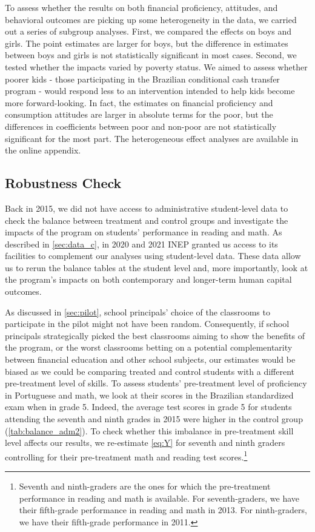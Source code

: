 To assess whether the results on both financial proficiency, attitudes, and behavioral outcomes are picking up some heterogeneity in the data, we carried out a series of subgroup analyses. First, we compared the effects on boys and girls. The point estimates are larger for boys, but the difference in estimates between boys and girls is not statistically significant in most cases. Second, we tested whether the impacts varied by poverty status. We aimed to assess whether poorer kids - those participating in the Brazilian conditional cash transfer program - would respond less to an intervention intended to help kids become more forward-looking. In fact, the estimates on financial proficiency and consumption attitudes are larger in absolute terms for the poor, but the differences in coefficients between poor and non-poor are not statistically significant for the most part. The heterogeneous effect analyses are available in the online appendix.   

\subsection{Robustness Check} 

Back in 2015, we did not have access to administrative student-level data to check the balance between treatment and control groups and investigate the impacts of the program on students' performance in reading and math. As described in \autoref{sec:data_c}, in 2020 and 2021 INEP granted us access to its facilities to complement our analyses using student-level data. These data allow us to rerun the balance tables at the student level and, more importantly, look at the program's impacts on both contemporary and longer-term human capital outcomes.

As discussed in \autoref{sec:pilot}, school principals' choice of the classrooms to participate in the pilot might not have been random. Consequently, if school principals strategically picked the best classrooms aiming to show the benefits of the program, or the worst classrooms betting on a potential complementarity between financial education and other school subjects, our estimates would be biased as we could be comparing treated and control students with a different pre-treatment level of skills. To assess students' pre-treatment level of proficiency in Portuguese and math, we look at their scores in the Brazilian standardized exam when in grade 5. Indeed, the average test scores in grade 5 for students attending the seventh and ninth grades in 2015 were higher in the control group (\autoref{tab:balance_adm2}). To check whether this imbalance in pre-treatment skill level affects our results, we re-estimate \autoref{eq:Y} for seventh and ninth graders controlling for their pre-treatment math and reading test scores.\footnote{Seventh and ninth-graders are the ones for which the pre-treatment performance in reading and math is available. For seventh-graders, we have their fifth-grade performance in reading and math in 2013. For ninth-graders, we have their fifth-grade performance in 2011.} 

